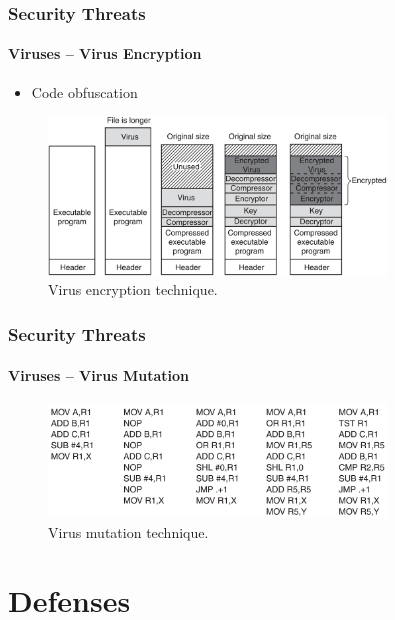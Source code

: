 \documentclass{beamer}
\begin{document}
	\begin{frame}
	\frametitle{Security Threats}
	\framesubtitle{Viruses -- Virus Encryption}
	\begin{itemize}
	\setlength\itemsep{1.0em}
		\item Code obfuscation
	\end{itemize}
	\begin{figure}
		\centering
		\includegraphics[width=0.8\textwidth]{virus-encryption}
		\caption{Virus encryption technique.}
	\end{figure}
	\end{frame}

	\begin{frame}
	\frametitle{Security Threats}
	\framesubtitle{Viruses -- Virus Mutation}
	\begin{figure}
		\centering
		\includegraphics[width=0.8\textwidth]{virus-mutation}
		\caption{Virus mutation technique.}
	\end{figure}
	\end{frame}

\section{Defenses}
\end{document}
